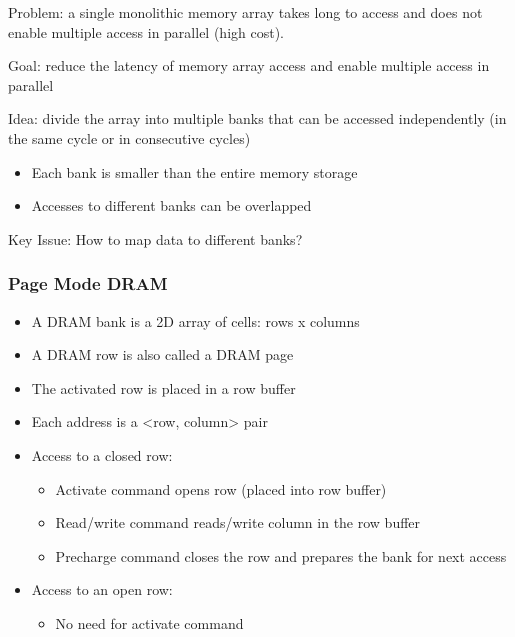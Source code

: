 \documentclass[]{article}
\providecommand{\tightlist}{%
  \setlength{\itemsep}{0pt}\setlength{\parskip}{0pt}}
\begin{document}
Problem: a single monolithic memory array takes long to access and does
not enable multiple access in parallel (high cost).

Goal: reduce the latency of memory array access and enable multiple
access in parallel

Idea: divide the array into multiple banks that can be accessed
independently (in the same cycle or in consecutive cycles)

\begin{itemize}
\tightlist
\item
  Each bank is smaller than the entire memory storage
\item
  Accesses to different banks can be overlapped
\end{itemize}

Key Issue: How to map data to different banks?

\hypertarget{page-mode-dram}{%
\subsubsection{Page Mode DRAM}\label{page-mode-dram}}

\begin{itemize}
\tightlist
\item
  A DRAM bank is a 2D array of cells: rows x columns
\item
  A DRAM row is also called a DRAM page
\item
  The activated row is placed in a row buffer
\item
  Each address is a \textless{}row, column\textgreater{} pair
\item
  Access to a closed row:

  \begin{itemize}
  \tightlist
  \item
    Activate command opens row (placed into row buffer)
  \item
    Read/write command reads/write column in the row buffer
  \item
    Precharge command closes the row and prepares the bank for next
    access
  \end{itemize}
\item
  Access to an open row:

  \begin{itemize}
  \tightlist
  \item
    No need for activate command
  \end{itemize}
\end{itemize}
\end{document}
